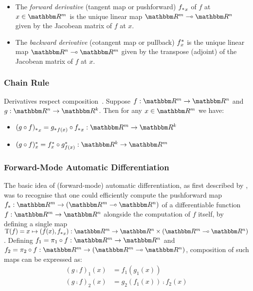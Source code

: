 \begin{itemize}
\item The \emph{forward derivative} (tangent map or pushforward) ${f_{*}}_x$ of $f$ at $x \in \RR^m$ is the
unique linear map $\RR^m \linearto \RR^n$ given by the Jacobean matrix of $f$ at $x$.
\item The \emph{backward derivative} (cotangent map or pullback) $f^{*}_x$ is the unique linear map
$\RR^n \linearto \RR^m$ given by the transpose (adjoint) of the Jacobean matrix of $f$ at $x$.
\end{itemize}

\subsubsection{Chain Rule}

Derivatives respect composition~\cite{spivak65}. Suppose $f: \RR^m \to \RR^n$ and $g: \RR^n \to \RR^k$. Then
for any $x \in \RR^m$ we have:

\begin{itemize}
\item $\pushf{(g \comp f)}_x = \pushf{g}_{f(x)} \comp \pushf{f}_x: \RR^m \to \RR^k$
\item $\pullf{(g \comp f)}_x = \pullf{f}_{x} \comp \pullf{g}_{f(x)}: \RR^k \to \RR^m$
\end{itemize}

\subsubsection{Forward-Mode Automatic Differentiation}

The basic idea of (forward-mode) automatic differentiation, as first described by \citet{linnainmaa76}, was to
recognise that one could efficiently compute the pushforward map $\pushf{f}: \RR^m \to (\RR^m \linearto
\RR^n)$ of a differentiable function $f: \RR^m \to \RR^n$ alongside the computation of $f$ itself, by defining
a single map $\tangents(f) = x \mapsto (f(x), \pushf{f}_x): \RR^m \to \RR^n \times (\RR^m \linearto \RR^n)$.
Defining $f_1 = \pi_1 \comp f: \RR^m \to \RR^n$ and $f_2 = \pi_2 \comp f: \RR^m \to (\RR^m \linearto \RR^n)$,
composition of such maps can be expressed as:
\begin{align*}
(g \comp f)_1(x) &= f_1(g_1(x)) \\
(g \comp f)_2(x) &= g_2(f_1(x)) \comp f_2(x)
\end{align*}

